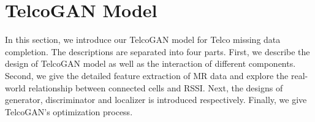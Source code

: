 \section{TelcoGAN Model}
In this section, we introduce our TelcoGAN model for Telco missing data completion. The descriptions are separated into four parts. First, we describe the design of TelcoGAN model as well as the interaction of different components. Second, we give the detailed feature extraction of MR data and explore the real-world relationship between connected cells and RSSI. Next, the designs of generator, discriminator and localizer is introduced respectively. Finally, we give TelcoGAN's optimization process.

